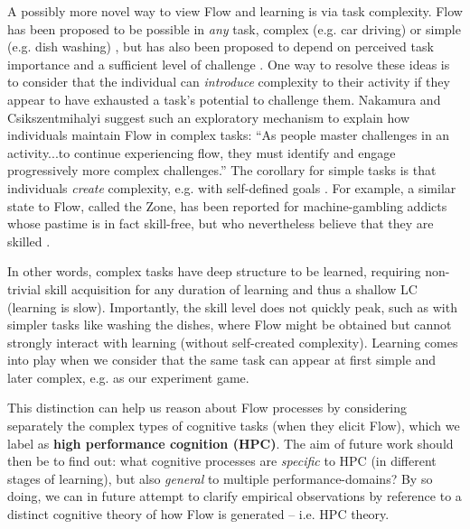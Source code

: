 \documentclass[fleqn,10pt]{wlscirep}
\begin{document}
A possibly more novel way to view Flow and learning is via task complexity. Flow has been proposed to be possible in {\it any} task, complex (e.g. car driving) or simple (e.g. dish washing) \cite{Csikszentmihalyi1999}, but has also been proposed to depend on perceived task importance and a sufficient level of challenge \cite{Keller2012}. One way to resolve these ideas is to consider that the individual can {\it introduce} complexity to their activity if they appear to have exhausted a task's potential to challenge them. Nakamura and Csikszentmihalyi \cite{Nakamura2002} suggest such an exploratory mechanism to explain how individuals maintain Flow in complex tasks: ``As people master challenges in an activity...to continue experiencing flow, they must identify and engage progressively more complex challenges.'' The corollary for simple tasks is that individuals {\it create} complexity, e.g. with self-defined goals \cite{Rauterberg1995}. For example, a similar state to Flow, called the Zone, has been reported for machine-gambling addicts whose pastime is in fact skill-free, but who nevertheless believe that they are skilled \cite{Schull2014}.

In other words, complex tasks have deep structure to be learned, requiring non-trivial skill acquisition for any duration of learning and thus a shallow LC (learning is slow). Importantly, the skill level does not quickly peak, such as with simpler tasks like washing the dishes, where Flow might be obtained but cannot strongly interact with learning (without self-created complexity). Learning comes into play when we consider that the same task can appear at first simple and later complex, e.g. as our experiment game.

This distinction can help us reason about Flow processes by considering separately the complex types of cognitive tasks (when they elicit Flow), which we label as {\bf high performance cognition (HPC)}. The aim of future work should then be to find out: what cognitive processes are {\it specific} to HPC (in different stages of learning), but also {\it general} to multiple performance-domains? By so doing, we can in future attempt to clarify empirical observations by reference to a distinct cognitive theory of how Flow is generated -- i.e. HPC theory.


\end{document}
